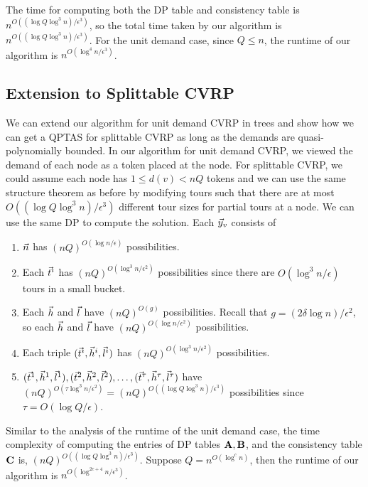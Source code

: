 \documentclass[twoside,leqno]{article}
\newcommand{\eps}{\epsilon}
\begin{document}
The time for computing both the DP table and consistency table is $n^{O((\log Q\log^3 n)/\eps^3)}$, so the total time taken by our algorithm is $n^{O((\log Q\log^3 n)/\eps^3)}$. For the unit demand case, since $Q \le n$, the runtime of our algorithm is $n^{O(\log^4 n/\eps^3)}$.

\subsection{Extension to Splittable CVRP}
We can extend our algorithm for unit demand CVRP in trees and show how we can get a QPTAS for splittable CVRP as long as the demands are quasi-polynomially bounded. In our algorithm for unit demand CVRP, we viewed the demand of each node as a token placed at the node. For splittable CVRP, we could assume each node has $1 \le d(v) < nQ$ tokens and we can use the same structure theorem as before by modifying tours such that there are at most $O((\log Q \log^3 n)/\eps^3)$ different tour sizes for partial tours at a node. We can use the same DP to compute the solution. Each $\vec{y}_v$ consists of
\begin{enumerate}
    \item $\vec{n}$ has $(nQ)^{O(\log n / \eps)}$ possibilities.
    \item Each $\vec{t}^i$ has $(nQ)^{O(\log^3 n /\eps^2)}$ possibilities since there are $O(\log^3 n /\eps)$ tours in a small bucket.
    \item Each $\vec{h}$ and $\vec{l}$ have $(nQ)^{O(g)}$ possibilities. Recall that $g = (2\delta \log n)/\eps^2 $, so each $\vec{h}$ and $\vec{l}$ have $(nQ)^{O(\log n /\eps^2)}$ possibilities.
    \item Each triple $(\vec{t}^i, \vec{h}^i, \vec{l}^i)$ has $(nQ)^{O(\log^3 n /\eps^2)}$ possibilities.
    \item $(\vec{t}^1, \vec{h}^1, \vec{l}^1), (\vec{t}^2, \vec{h}^2, \vec{l}^2), \ldots, (\vec{t}^\tau, \vec{h}^\tau, \vec{l}^\tau)$ have $(nQ)^{O(\tau \log^3 n /\eps^2)} = (nQ)^{O((\log Q\log^3 n)/\eps^3)}$ possibilities since $\tau = O(\log Q/\eps)$.
\end{enumerate}
Similar to the analysis of the runtime of the unit demand case, the time complexity of computing the entries of DP tables $\textbf{A}, \textbf{B}$, and the consistency table $\textbf{C}$ is, $(nQ)^{O((\log Q\log^3 n)/\eps^3)}$. Suppose $Q = n^{O(\log^c n)}$, then the runtime of our algorithm is $n^{O(\log^{2c+4} n/\eps^3)}$.

\end{document}
